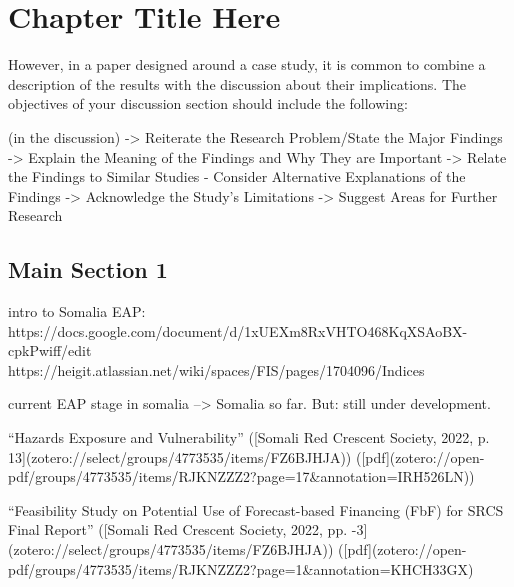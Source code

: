 
\chapter{Chapter Title Here} %

\label{ChapterX} %


However, in a paper designed around a case study, it is common to combine a description of the results with the discussion about their implications. The objectives of your discussion section should include the following:

(in the discussion)
-> Reiterate the Research Problem/State the Major Findings
-> Explain the Meaning of the Findings and Why They are Important
-> Relate the Findings to Similar Studies
- Consider Alternative Explanations of the Findings
-> Acknowledge the Study's Limitations
-> Suggest Areas for Further Research


\section{Main Section 1}

intro to Somalia EAP: https://docs.google.com/document/d/1xUEXm8RxVHTO468KqXSAoBX-cpkPwiff/edit
https://heigit.atlassian.net/wiki/spaces/FIS/pages/1704096/Indices

current EAP stage in somalia
--> Somalia so far. But: still under development.

“Hazards Exposure and Vulnerability” ([Somali Red Crescent Society, 2022, p. 13](zotero://select/groups/4773535/items/FZ6BJHJA)) ([pdf](zotero://open-pdf/groups/4773535/items/RJKNZZZ2?page=17&annotation=IRH526LN))

“Feasibility Study on Potential Use of Forecast-based Financing (FbF) for SRCS Final Report” ([Somali Red Crescent Society, 2022, pp. -3](zotero://select/groups/4773535/items/FZ6BJHJA)) ([pdf](zotero://open-pdf/groups/4773535/items/RJKNZZZ2?page=1&annotation=KHCH33GX)





